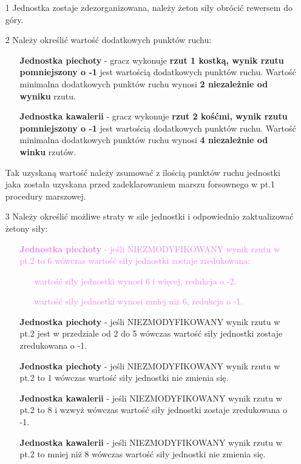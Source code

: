 \begin{itemize}
    \item[1] Jednostka zostaje zdezorganizowana, należy żeton siły obrócić rewersem do góry.
	\item[2] Należy określić wartość dodatkowych punktów ruchu:
	\begin{itemize}
		\item[] \textbf{Jednostka piechoty} - gracz wykonuje \textbf{rzut 1 kostką, wynik rzutu pomniejszony o -1} jest wartością dodatkowych punktów ruchu. Wartość minimalna dodatkowych punktów ruchu wynosi \textbf{2 niezależnie od wyniku} rzutu.
		\item[] \textbf{Jednostka kawalerii} - gracz wykonuje \textbf{rzut 2 kośćmi, wynik rzutu pomniejszony o -1} jest wartością dodatkowych punktów ruchu. Wartość minimalna dodatkowych punktów ruchu  wynosi \textbf{4 niezależnie od winku} rzutów.
	\end{itemize}
	Tak uzyskaną wartość należy zsumować z ilością punktów ruchu jednostki jaka została uzyskana przed zadeklarowaniem marszu forsownego w pt.1 procedury marszowej. 
	\item[3] Należy określić możliwe straty w sile jednostki i odpowiednio zaktualizować żetony siły:
	\begin{itemize}
		\item[] \textcolor{violet}{\textbf{Jednostka piechoty} - jeśli NIEZMODYFIKOWANY wynik rzutu w pt.2 to 6 wówczas wartość siły jednostki zostaje zredukowana:
		\begin{itemize}
			\item[] wartość siły jednostki wynosi 6 i więcej, redukcja o -2.
			\item[] wartość siły jednostki wynosi mniej niż 6, redukcja o -1.
		\end{itemize}}
		\item[] \textbf{Jednostka piechoty} - jeśli NIEZMODYFIKOWANY wynik rzutu w pt.2 jest w przedziale od 2 do 5 wówczas wartość siły jednostki zostaje zredukowana o -1.
		\item[] \textbf{Jednostka piechoty} - jeśli NIEZMODYFIKOWANY wynik rzutu w pt.2 to 1 wówczas wartość siły jednostki nie zmienia się.
		\item[] \textbf{Jednostka kawalerii} - jeśli NIEZMODYFIKOWANY wynik rzutu w pt.2 to 8 i wzwyż wówczas wartość siły jednostki zostaje zredukowana o -1.
		\item[] \textbf{Jednostka kawalerii} - jeśli NIEZMODYFIKOWANY wynik rzutu w pt.2 to mniej niż 8 wówczas wartość siły jednostki nie zmienia się.
	\end{itemize}
\end{itemize}
